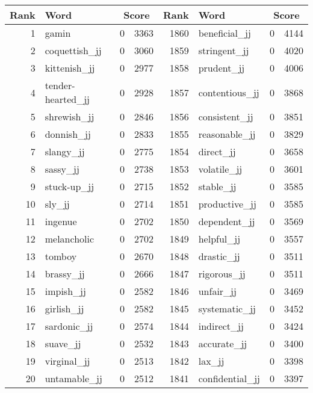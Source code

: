 \begin{table}[tbp]
    \begin{tabular}{| rlr@{.}l | rlr@{.}l |}
    \hline
    \textbf{Rank} & \textbf{Word} & \multicolumn{2}{c|}{\textbf{Score}} & \textbf{Rank} & \textbf{Word} & \multicolumn{2}{c|}{\textbf{Score}} \\
    \hline
    1 & gamin & 0 & 3363    &    1860 & beneficial\_jj & 0 & 4144 \\
    2 & coquettish\_jj & 0 & 3060    &    1859 & stringent\_jj & 0 & 4020 \\
    3 & kittenish\_jj & 0 & 2977    &    1858 & prudent\_jj & 0 & 4006 \\
    4 & tender-hearted\_jj & 0 & 2928    &    1857 & contentious\_jj & 0 & 3868 \\
    5 & shrewish\_jj & 0 & 2846    &    1856 & consistent\_jj & 0 & 3851 \\
    6 & donnish\_jj & 0 & 2833    &    1855 & reasonable\_jj & 0 & 3829 \\
    7 & slangy\_jj & 0 & 2775    &    1854 & direct\_jj & 0 & 3658 \\
    8 & sassy\_jj & 0 & 2738    &    1853 & volatile\_jj & 0 & 3601 \\
    9 & stuck-up\_jj & 0 & 2715    &    1852 & stable\_jj & 0 & 3585 \\
    10 & sly\_jj & 0 & 2714    &    1851 & productive\_jj & 0 & 3585 \\
    11 & ingenue & 0 & 2702    &    1850 & dependent\_jj & 0 & 3569 \\
    12 & melancholic & 0 & 2702    &    1849 & helpful\_jj & 0 & 3557 \\
    13 & tomboy & 0 & 2670    &    1848 & drastic\_jj & 0 & 3511 \\
    14 & brassy\_jj & 0 & 2666    &    1847 & rigorous\_jj & 0 & 3511 \\
    15 & impish\_jj & 0 & 2582    &    1846 & unfair\_jj & 0 & 3469 \\
    16 & girlish\_jj & 0 & 2582    &    1845 & systematic\_jj & 0 & 3452 \\
    17 & sardonic\_jj & 0 & 2574    &    1844 & indirect\_jj & 0 & 3424 \\
    18 & suave\_jj & 0 & 2532    &    1843 & accurate\_jj & 0 & 3400 \\
    19 & virginal\_jj & 0 & 2513    &    1842 & lax\_jj & 0 & 3398 \\
    20 & untamable\_jj & 0 & 2512    &    1841 & confidential\_jj & 0 & 3397 \\

\end{tabular}
\end{table}
